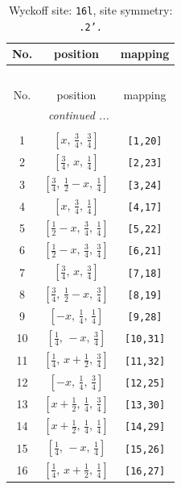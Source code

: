 \documentclass[fleqn,8pt]{jsarticle}
\begin{document}
\renewcommand{\arraystretch}{1.2}
\begin{longtable}{ccc}
\caption{Wyckoff site: {\tt 16l}, site symmetry: {\tt .2'.}}
 \\
 \hline \hline
No. & position & mapping \\ \hline \endfirsthead

\multicolumn{2}{l}{\tablename\ \thetable{}} \\
 \hline \hline
No. & position & mapping \\ \hline \endhead

 \hline \hline
\multicolumn{2}{r}{\footnotesize\it continued ...} \\ \endfoot

 \hline \hline
\multicolumn{2}{r}{} \\ \endlastfoot

1 & $\left[ x,\, \frac{3}{4},\, \frac{3}{4} \right]$ & {\tt [1,20]} \\ \hline
2 & $\left[ \frac{3}{4},\, x,\, \frac{1}{4} \right]$ & {\tt [2,23]} \\ \hline
3 & $\left[ \frac{3}{4},\, \frac{1}{2} - x,\, \frac{1}{4} \right]$ & {\tt [3,24]} \\ \hline
4 & $\left[ x,\, \frac{3}{4},\, \frac{1}{4} \right]$ & {\tt [4,17]} \\ \hline
5 & $\left[ \frac{1}{2} - x,\, \frac{3}{4},\, \frac{1}{4} \right]$ & {\tt [5,22]} \\ \hline
6 & $\left[ \frac{1}{2} - x,\, \frac{3}{4},\, \frac{3}{4} \right]$ & {\tt [6,21]} \\ \hline
7 & $\left[ \frac{3}{4},\, x,\, \frac{3}{4} \right]$ & {\tt [7,18]} \\ \hline
8 & $\left[ \frac{3}{4},\, \frac{1}{2} - x,\, \frac{3}{4} \right]$ & {\tt [8,19]} \\ \hline
9 & $\left[ - x,\, \frac{1}{4},\, \frac{1}{4} \right]$ & {\tt [9,28]} \\ \hline
10 & $\left[ \frac{1}{4},\, - x,\, \frac{3}{4} \right]$ & {\tt [10,31]} \\ \hline
11 & $\left[ \frac{1}{4},\, x + \frac{1}{2},\, \frac{3}{4} \right]$ & {\tt [11,32]} \\ \hline
12 & $\left[ - x,\, \frac{1}{4},\, \frac{3}{4} \right]$ & {\tt [12,25]} \\ \hline
13 & $\left[ x + \frac{1}{2},\, \frac{1}{4},\, \frac{3}{4} \right]$ & {\tt [13,30]} \\ \hline
14 & $\left[ x + \frac{1}{2},\, \frac{1}{4},\, \frac{1}{4} \right]$ & {\tt [14,29]} \\ \hline
15 & $\left[ \frac{1}{4},\, - x,\, \frac{1}{4} \right]$ & {\tt [15,26]} \\ \hline
16 & $\left[ \frac{1}{4},\, x + \frac{1}{2},\, \frac{1}{4} \right]$ & {\tt [16,27]} \\
\end{longtable}
\end{document}
